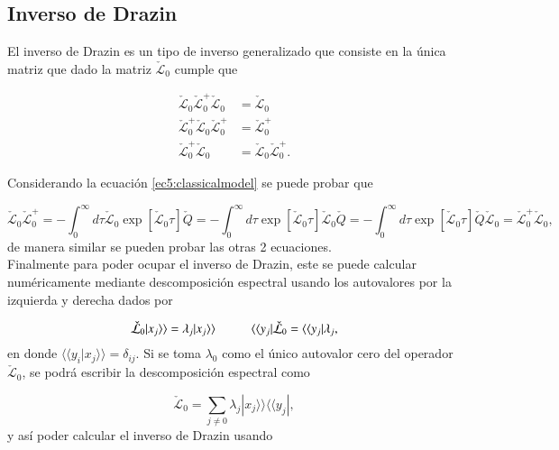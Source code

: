 \begin{appendixs}
\label{appendix5clasic}

\subsection{ Inverso de Drazin }
El inverso de Drazin es un tipo de inverso generalizado que consiste en la única matriz que  dado la matriz $\check{\mathcal{L}}_{0}$ cumple que 

\begin{align*}
    \check{\mathcal{L}}_{0}\check{\mathcal{L}}_{0}^{+}\check{\mathcal{L}}_{0} & = \check{\mathcal{L}}_{0} \\
    \check{\mathcal{L}}_{0}^{+}\check{\mathcal{L}}_{0}\check{\mathcal{L}}_{0}^{+} & = \check{\mathcal{L}}_{0}^{+} \\
    \check{\mathcal{L}}_{0}^{+}\check{\mathcal{L}}_{0} & = \check{\mathcal{L}}_{0}\check{\mathcal{L}}_{0}^{+}.
\end{align*}

Considerando la ecuación \ref{ec5:classicalmodel} se puede probar que 

\begin{equation*}
    \check{\mathcal{L}}_{0}\check{\mathcal{L}}_{0}^{+} = - \int_{0}^{\infty}d\tau \check{\mathcal{L}}_{0}\exp[ \check{\mathcal{L}}_{0}\tau] \check{Q}= - \int_{0}^{\infty}d\tau \exp[ \check{\mathcal{L}}_{0}\tau]\check{\mathcal{L}}_{0} \check{Q} = - \int_{0}^{\infty}d\tau \exp[ \check{\mathcal{L}}_{0}\tau] \check{Q} \check{\mathcal{L}}_{0} = \check{\mathcal{L}}_{0}^{+}\check{\mathcal{L}}_{0},
\end{equation*}
de manera similar se pueden probar las otras 2 ecuaciones.\\
 Finalmente para poder ocupar el inverso de Drazin, este se puede calcular numéricamente mediante descomposición espectral usando los autovalores por la izquierda y derecha dados por 

\begin{equation*}
    \check{\mathcal{L}}_{0}|x_{j}\rangle \rangle = \lambda_{j} |x_{j}\rangle \rangle \hspace{10mm}  \langle \langle y_{j}|\check{\mathcal{L}}_{0} = \langle \langle y_{j}|\lambda_{j},
\end{equation*}
en donde $\langle \langle y_{i}|x_{j}\rangle \rangle = \delta_{ij}$. Si se toma $\lambda_{0}$ como el único autovalor cero del operador $\check{\mathcal{L}}_{0}$, se podrá escribir la descomposición espectral como

\begin{equation*}
    \check{\mathcal{L}}_{0} = \sum_{j\neq 0}\lambda_{j}|x_{j}\rangle \rangle \langle \langle y_{j}|,
\end{equation*}
y así poder calcular el inverso de Drazin usando


\end{appendixs}

